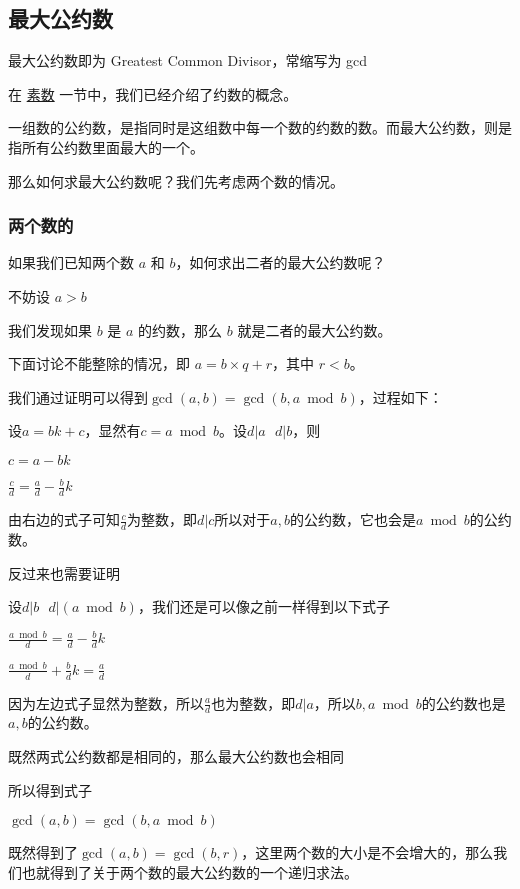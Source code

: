 
\subsection{最大公约数}

最大公约数即为 Greatest Common Divisor，常缩写为 gcd

在 \href{/math/prime}{素数} 一节中，我们已经介绍了约数的概念。

一组数的公约数，是指同时是这组数中每一个数的约数的数。而最大公约数，则是指所有公约数里面最大的一个。

那么如何求最大公约数呢？我们先考虑两个数的情况。

\subsubsection{两个数的}

如果我们已知两个数 $a$ 和 $b$，如何求出二者的最大公约数呢？

不妨设 $a > b$

我们发现如果 $b$ 是 $a$ 的约数，那么 $b$ 就是二者的最大公约数。

下面讨论不能整除的情况，即 $a = b \times q + r$，其中 $r < b$。

我们通过证明可以得到$\gcd(a,b)=\gcd(b,a \bmod b)$，过程如下：

\hr

设$a=bk+c$，显然有$c=a \bmod b$。设$d|a\ \ \ d|b$，则

$c=a-bk$

$\frac{c}{d}=\frac{a}{d}-\frac{b}{d}k$

由右边的式子可知$\frac{c}{d}$为整数，即$d|c$所以对于$a,b$的公约数，它也会是$a \bmod b$的公约数。

反过来也需要证明

设$d|b\ \ \ d|(a \bmod b)$，我们还是可以像之前一样得到以下式子

$\frac{a\bmod b}{d}=\frac{a}{d}-\frac{b}{d}k$

$\frac{a\bmod b}{d}+\frac{b}{d}k=\frac{a}{d}$

因为左边式子显然为整数，所以$\frac{a}{d}$也为整数，即$d|a$，所以$b,a\bmod b$的公约数也是$a,b$的公约数。

既然两式公约数都是相同的，那么最大公约数也会相同

所以得到式子

$\gcd(a,b)=\gcd(b,a\bmod b)$

既然得到了$\gcd(a, b) = \gcd(b, r)$，这里两个数的大小是不会增大的，那么我们也就得到了关于两个数的最大公约数的一个递归求法。

